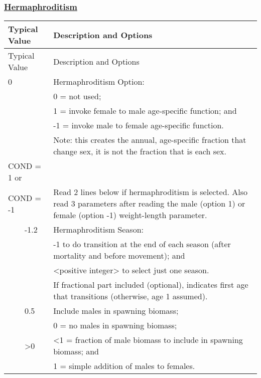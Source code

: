 \hypertarget{Hermaphroditism}{}
\subsubsection[Hermaphroditism]{\protect\hyperlink{Hermaphroditism}{Hermaphroditism}}

\begin{longtable}{p{0.5cm} p{2cm} p{13cm}}
	\hline	
	\multicolumn{2}{l}{Typical Value} & Description and Options \Tstrut\Bstrut\\
	\hline
	\endfirsthead

	\hline
	\multicolumn{2}{l}{Typical Value} & Description and Options \Tstrut\Bstrut\\
	\hline
	\endhead
	\hline

	\endfoot
	
	\endlastfoot

	0 & & Hermaphroditism Option: \Tstrut\\
	 &  & 0 = not used; \\
	 &  & 1 = invoke female to male age-specific function; and \\
	 &  & -1 = invoke male to female age-specific function. \\
	 &  & Note: this creates the annual, age-specific fraction that change sex, it is not the fraction that is each sex. \Bstrut\\
	\hline

	\multicolumn{2}{l}{COND = 1 or} \Tstrut & \\
	\multicolumn{2}{l}{COND = -1} & Read 2 lines below if hermaphroditism is selected. Also read 3 parameters after reading the male (option 1) or female (option -1) weight-length parameter. \Bstrut\\
	& -1.2 & Hermaphroditism Season: \\
	&    & -1 to do transition at the end of each season (after mortality and before movement); and \\
	&    & <positive integer> to select just one season. \\
    &	 & If fractional part included (optional), indicates first age that transitions (otherwise, age 1 assumed). \\
	& 0.5 & Include males in spawning biomass; \\
	&    & 0 = no males in spawning biomass; \\
	& >0 & <1 = fraction of male biomass to include in spawning biomass; and \\
	&    & 1 = simple addition of males to females. \Bstrut\\
	\hline
\end{longtable}
\vspace*{-\baselineskip}

